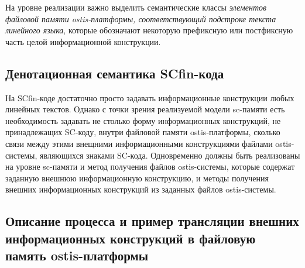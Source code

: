 На уровне реализации важно выделить семантические классы \textit{элементов файловой памяти ostis-платформы, соответствующий подстроке текста линейного языка}, которые обозначают некоторую префиксную или постфиксную часть целой информационной конструкции.

\subsection{Денотационная семантика SCfin-кода}
\label{sec_soft_platform_scfin_code_semantic}

\begin{SCn}
\begin{scnsubstruct}

\begin{scnindent}
    \begin{scneqtoset}
    \end{scneqtoset}
\end{scnindent}

\end{scnsubstruct}
\end{SCn}

На SCfin-коде достаточно просто задавать информационные конструкции любых линейных текстов. Однако с точки зрения реализуемой модели sc-памяти есть необходимость задавать не столько форму информационных конструкций, не принадлежащих SC-коду, внутри файловой памяти ostis-платформы, сколько связи между этими внещними информационными конструкциями файлами ostis-системы, являющихся знаками SC-кода. Одновременно должны быть реализованы на уровне sc-памяти и метод получения файлов ostis-системы, которые содержат заданную внешнюю информационную конструкцию, и методы получения внешних информационных конструкций из заданных файлов ostis-системы.

\subsection{Описание процесса и пример трансляции внешних информационных конструкций в файловую память ostis-платформы}
\label{sec_soft_platform_scfin_code_example}

